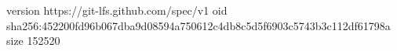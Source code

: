 version https://git-lfs.github.com/spec/v1
oid sha256:452200fd96b067dba9d08594a750612c4db8c5d5f6903c5743b3c112df61798a
size 152520
